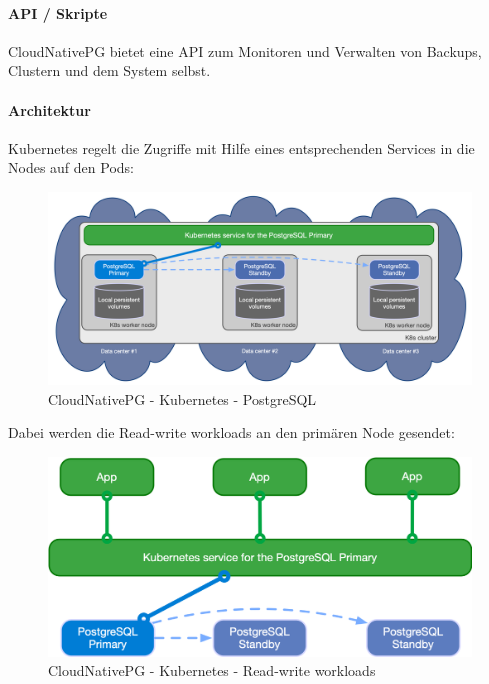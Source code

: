 \begin{flushleft}
    \paragraph{API / Skripte}
    CloudNativePG bietet eine API zum Monitoren und Verwalten von Backups, Clustern und dem System selbst\cite{LY8V4XQM}.
\end{flushleft}
\begin{flushleft}
    \paragraph{Architektur}
    Kubernetes regelt die Zugriffe mit Hilfe eines entsprechenden Services in die Nodes auf den Pods:
    \begin{figure}[H]
        \centering
        \includegraphics[width=0.75\linewidth]{source/implementation/evaluation/postgresql_ha_solutions/cloudnativepg/k8s-pg-architecture}
        \caption{CloudNativePG - Kubernetes - PostgreSQL}
        \label{fig:k8s-pg-architecture}
    \end{figure}
\end{flushleft}
\begin{flushleft}
    Dabei werden die Read-write workloads an den primären Node gesendet:
    \begin{figure}[H]
        \centering
        \includegraphics[width=0.75\linewidth]{source/implementation/evaluation/postgresql_ha_solutions/cloudnativepg/cloudnativepg-architecture-rw}
        \caption{CloudNativePG - Kubernetes - Read-write workloads}
        \label{fig:cloudnativepg-architecture-rw}
    \end{figure}
\end{flushleft}
